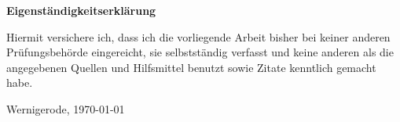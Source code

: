 \thispagestyle{empty}
\begin{LARGE}
\textbf{Eigenständigkeitserklärung}
\end{LARGE}
\bigskip
\bigskip
\par

Hiermit versichere ich, dass ich die vorliegende Arbeit bisher bei keiner anderen 
Prüfungsbehörde eingereicht, sie selbstständig verfasst und keine anderen als die 
angegebenen Quellen und Hilfsmittel benutzt sowie Zitate kenntlich gemacht habe.

\bigskip
\bigskip
\bigskip

Wernigerode, \today

\clearpage
